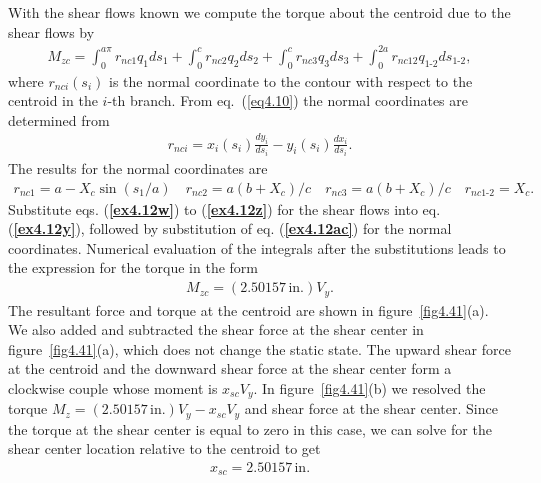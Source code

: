 \documentclass{AeroStructure-ERJohnson}
\begin{document}
\begin{example}
With the shear flows known we compute the torque about the centroid due to the shear flows by
\setcounter{equation}{0}\def\theequation{a\alph{equation}}
\begin{align}\label{ex4.12aa}
M_{z c}=\int_{0}^{a \pi} r_{n c 1} q_{1} d s_{1}+\int_{0}^{c} r_{n c 2} q_{2} d s_{2}+\int_{0}^{c} r_{n c 3} q_{3} d s_{3}+\int_{0}^{2a} r_{n c 12} q_{\textrm{1-2}} d s_{\textrm{1-2}},\tag{aa}
\end{align}
where $r_{n c i}\left(s_{i}\right)$ is the normal coordinate to the contour with respect to the centroid in the $i$-th branch. From eq.~(\ref{eq4.10}) the normal coordinates are determined from
\begin{align}\label{ex4.12ab}
r_{n c i}=x_{i}\left(s_{i}\right) \frac{d y_{i}}{d s_{i}}-y_{i}\left(s_{i}\right) \frac{d x_{i}}{d s_{i}}.\tag{ab}
\end{align}
The results for the normal coordinates are
\begin{align}\label{ex4.12ac}
r_{n c 1}=a-X_{c} \sin \left(s_{1}/a\right) \quad r_{n c 2}=a\left(b+X_{c}\right)/c \quad r_{n c 3}=a\left(b+X_{c}\right)/c \quad r_{n c 1\mbox{-}2}=X_{c}.\tag{ac}
\end{align}
Substitute eqs. (\textbf{\ref{ex4.12w}}) to (\textbf{\ref{ex4.12z}}) for the shear flows into eq. (\textbf{\ref{ex4.12y}}), followed by substitution of eq. (\textbf{\ref{ex4.12ac}}) for the normal coordinates. Numerical evaluation of the integrals after the substitutions leads to the expression for the torque in the form
\begin{align}\label{ex4.12ad}
M_{z c}=(2.50157\,\textrm{in}.) V_{y}.\tag{ad}
\end{align}
The resultant force and torque at the centroid are shown in figure~\ref{fig4.41}(a). We also added and subtracted the shear force at the shear center in figure~\ref{fig4.41}(a), which does not change the static state. The upward shear force at the centroid and the downward shear force at the shear center form a clockwise couple whose moment is $x_{s c} V_{y}$. In figure~\ref{fig4.41}(b) we resolved the torque $M_{z}=(2.50157\,\textrm{in}.) V_{y}-x_{s c} V_{y}$ and shear force at the shear center. Since the torque at the shear center is equal to zero in this case, we can solve for the shear center location relative to the centroid to get
\begin{align}\label{ex4.12ae}
x_{s c}=2.50157\,\textrm{in}.\tag{ae}
\end{align}

{\def\thefigure{4.41}
}


\end{example}
\end{document}
